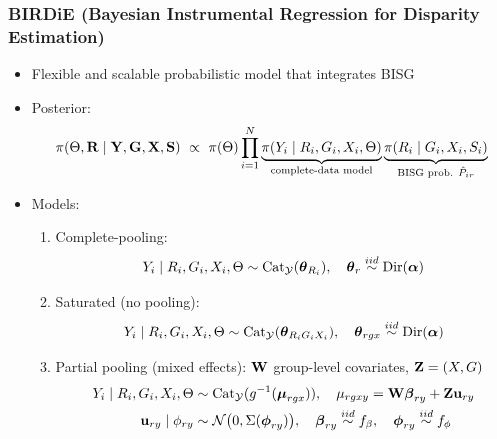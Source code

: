 \documentclass{beamer}
\newcommand{\iid}{\mathrel{\stackrel{iid}{\sim}}}
\newcommand{\Categorical}{\mathrm{Cat}}
\newcommand{\Dirichlet}{\mathrm{Dir}\qty}
\newcommand{\Norm}{\mathcal{N}\qty}
\newcommand{\cY}{\mathcal{Y}}
\begin{document}
\begin{frame}

  \frametitle{BIRDiE {\small (Bayesian Instrumental Regression for Disparity
    Estimation)}}

\begin{itemize}
\item Flexible and scalable probabilistic model that integrates BISG 

\item Posterior:
    $$\pi(\Theta, \vb R\mid \vb Y, \vb G, \vb X, \vb S)
    \ \propto \ \pi(\Theta)\prod_{i=1}^N \underbrace{\pi(Y_i\mid R_i,
      G_i, X_i, \Theta)}_{\text{complete-data model}}
            \underbrace{\pi(R_i\mid G_i, X_i, S_i)}_{\text{BISG prob. } \hat{P}_{ir}}$$
\item Models: 
  \begin{enumerate}
  \item Complete-pooling:
$$Y_i\mid R_i, G_i, X_i, \Theta \sim \Categorical_{\cY}(\vb*\theta_{R_i}), \quad
        \vb*\theta_r \iid \Dirichlet(\vb*\alpha)$$
  \item Saturated (no pooling):
$$Y_i\mid R_i, G_i, X_i, \Theta \sim \Categorical_{\cY}(\vb*\theta_{R_iG_iX_i}), \quad
        \vb*\theta_{rgx} \iid \Dirichlet(\vb*\alpha)$$
      \item Partial pooling (mixed effects): $\vb W$ group-level
        covariates, $\vb Z=(X,G)$
        \begin{align*}
    Y_i\mid R_i, G_i, X_i, \Theta &\sim
                                    \Categorical_{\cY}(g^{-1}(\vb*\mu_{rgx})), \quad
    \mu_{rgxy} = \vb W\vb*\beta_{ry} + \vb Z\vb u_{ry} \\
    \quad \vb u_{ry}\mid \phi_{ry} &\sim \Norm(0,
                                     \Sigma(\vb*\phi_{ry})), \quad
    \vb*\beta_{ry} \iid f_\beta, \quad \vb*\phi_{ry} \iid f_\phi
        \end{align*}
        \vspace{-.2in}
  \end{enumerate}

  
\end{itemize}

\end{frame}
\end{document}

